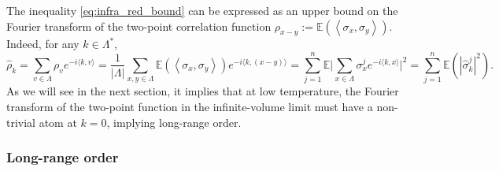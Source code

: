 \documentclass[12pt,reqno]{article}
\def\E{\mathbb{E}}
\begin{document}
The inequality \eqref{eq:infra_red_bound} can be expressed as an upper bound on the Fourier transform of the two-point correlation function $\rho_{x-y}:=\E(\left\langle\sigma_x,\sigma_y\right\rangle)$. Indeed, for any $k \in \Lambda^*$,
\begin{equation*}
  \hat{\rho}_k = \sum_{v \in \Lambda} \rho_v e^{-i\langle k,v\rangle} = \frac{1}{|\Lambda|}\sum_{x,y\in \Lambda} \E(\left\langle\sigma_x,\sigma_y\right\rangle)e^{-i\langle k,(x-y)\rangle} = \sum_{j=1}^n\E\Big|\sum_{x\in \Lambda}\sigma^j_x e^{-i\langle k,x\rangle}\Big|^2 = \sum_{j=1}^n \E\left(|\hat{\sigma}^j_k|^2\right).
\end{equation*}
As we will see in the next section, it implies that at low temperature, the Fourier transform of the two-point function in the infinite-volume limit must have a non-trivial atom at $k=0$, implying long-range order.


\subsubsection{Long-range order}
\end{document}
